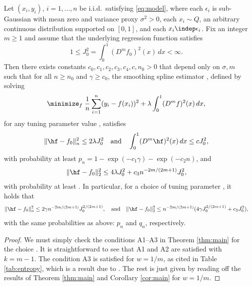 \documentclass{article}
\begin{document}
\begin{corollary}
\label{cor:ss}
Let $(x_i,y_i)$, $i=1,\dots,n$ be i.i.d.\ satisfying \eqref{eq:model}, where
each $\epsilon_i$ is sub-Gaussian with mean zero and variance proxy
$\sigma^2>0$, each $x_i \sim Q$, an arbitrary continuous distribution supported
on $[0,1]$, and each $x_i \indep \epsilon_i$. Fix an integer $m \geq 1$ and
assume that the underlying regression function satisfies  
\[
1 \leq  J_0^2 = \int_0^1 (D^m f_0)^2(x) \, dx < \infty.
\]
Then there exists constants $c_0,c_1,c_2,c_3,c_4,c,n_0>0$ that depend only on     
$\sigma,m$ such that for all $n \geq n_0$ and $\gamma \geq c_0$, the
smoothing spline estimator \smash{$\hf$}, defined by solving
\[
\minimize_f \; \frac{1}{n} \sum_{i=1}^n (y_i - f(x_i))^2 + \lambda \int_0^1 (D^m
f)^2(x) \, dx, 
\]
for any tuning parameter value , satisfies       
\[
\|\hf - f_0\|_n^2 \leq 2 \lambda J_0^2\quad \text{and} \quad 
\int_0^1 (D^m \hf)^2(x) \, dx \leq c J_0^2, 
\]
with probability at least $p_n = 1 - \exp(-c_1\gamma) - \exp(-c_2n)$, and
\[
\|\hf - f_0\|_2^2 \leq 4 \lambda J_0^2 + c_3 n^{-2m/(2m+1)} J_0^2,
\]
with probability at least . In particular, for a choice of tuning parameter
, it holds that  
\[
\|\hf - f_0\|_n^2 \leq 2 \gamma n^{-2m/(2m+1)} J_0^{2/(2m+1)},  
\quad \text{and}  \quad
\|\hf - f_0\|_2^2 \leq n^{-2m/(2m+1)} (4 \gamma J_0^{2/(2m+1)} + c_3 J_0^2), 
\]
with the same probabilities as above: $p_n$ and $q_n$, respectively.
\end{corollary}

\begin{proof}
We must simply check the conditions A1--A3 in Theorem \ref{thm:main} for the
choice . It is straightforward to
see that A1 and A2 are satisfied with $k=m-1$. The condition A3 is satisfied for
$w=1/m$, as cited in Table \ref{tab:entropy}, which is a result due to
\citet{birman1967piecewise}. The rest is just given by reading off the results
of Theorem \ref{thm:main} and Corollary \ref{cor:main} for $w=1/m$.  
\end{proof}



\end{document}
